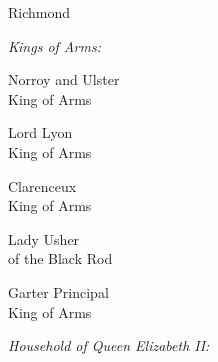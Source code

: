 \begin{center}
Richmond



{\itshape\color{qred}Kings of Arms:}


\begin{minipage}[t]{0.25\textwidth}\begin{center}
Norroy and Ulster\\
King of Arms\end{center}\end{minipage}
\begin{minipage}[t]{0.25\textwidth}\begin{center}
Lord Lyon\\
King of Arms\end{center}\end{minipage}
\begin{minipage}[t]{0.25\textwidth}\begin{center}
Clarenceux\\
King of Arms
\end{center}\end{minipage}

\begin{minipage}[t]{0.25\textwidth}\begin{center}
Lady Usher\\
of the Black Rod
\end{center}\end{minipage}
\begin{minipage}[t]{0.25\textwidth}\begin{center}
\end{center}\end{minipage}
\begin{minipage}[t]{0.25\textwidth}\begin{center}
Garter Principal\\
King of Arms\end{center}\end{minipage}

{\color{qred}\itshape Household of Queen Elizabeth II:}

\begin{minipage}[t]{0.15\textwidth}\begin{center}
\end{center}\end{minipage}





\end{center}
